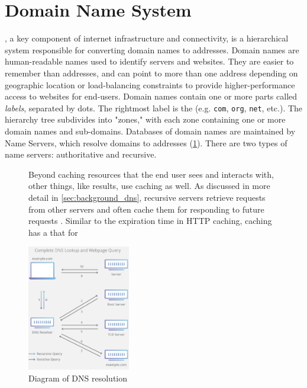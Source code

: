 \section{Domain Name System}\label{sec:background_dns}
\dns, a key component of internet infrastructure and connectivity, is a hierarchical system responsible for converting domain names to \ip addresses. Domain names are human-readable names used to identify servers and websites. They are easier to remember than \ip addresses, and can point to more than one address depending on geographic location or load-balancing constraints to provide higher-performance access to websites for end-users. Domain names contain one or more parts called \textit{labels}, separated by dots. The rightmost label is the \tld (e.g. \texttt{com}, \texttt{org}, \texttt{net}, etc.). The \dns hierarchy tree subdivides into "zones," with each zone containing one or more domain names and sub-domains. Databases of domain names are maintained by \dns Name Servers, which resolve domains to \ip addresses  (\cref{fig:dns_resolution}). There are two types of name servers: authoritative and recursive.

\begin{figure}Beyond caching resources that the end user sees and interacts with, other things, like \dns results, use caching as well. As discussed in more detail in \autoref{sec:background_dns}, recursive \dns servers retrieve requests from other \dns servers and often cache them for responding to future requests \cite{rfc1035}. Similar to the expiration time  in HTTP caching, \dns caching has a \ttl that for


    \centering
    \includegraphics[width=0.4\textwidth]{images/other/dns_lookup_diagram.png}
    \caption{Diagram of DNS resolution \cite{Cloudflare2020a}}
    \label{fig:dns_resolution}
\end{figure}

